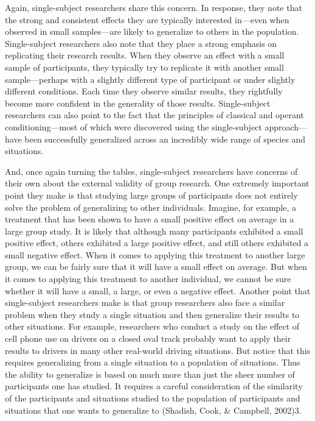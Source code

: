  Again, single-subject researchers share this concern. In response, they note that the strong and consistent effects they are typically interested in---even when observed in small samples---are likely to generalize to others in the population. Single-subject researchers also note that they place a strong emphasis on replicating their research results. When they observe an effect with a small sample of participants, they typically try to replicate it with another small sample---perhaps with a slightly different type of participant or under slightly different conditions. Each time they observe similar results, they rightfully become more confident in the generality of those results. Single-subject researchers can also point to the fact that the principles of classical and operant conditioning---most of which were discovered using the single-subject approach---have been successfully generalized across an incredibly wide range of species and situations.
 
 And, once again turning the tables, single-subject researchers have concerns of their own about the external validity of group research. One extremely important point they make is that studying large groups of participants does not entirely solve the problem of generalizing to other individuals. Imagine, for example, a treatment that has been shown to have a small positive effect on average in a large group study. It is likely that although many participants exhibited a small positive effect, others exhibited a large positive effect, and still others exhibited a small negative effect. When it comes to applying this treatment to another large group, we can be fairly sure that it will have a small effect on average. But when it comes to applying this treatment to another individual, we cannot be sure whether it will have a small, a large, or even a negative effect. Another point that single-subject researchers make is that group researchers also face a similar problem when they study a single situation and then generalize their results to other situations. For example, researchers who conduct a study on the effect of cell phone use on drivers on a closed oval track probably want to apply their results to drivers in many other real-world driving situations. But notice that this requires generalizing from a single situation to a population of situations. Thus the ability to generalize is based on much more than just the sheer number of participants one has studied. It requires a careful consideration of the similarity of the participants and situations studied to the population of participants and situations that one wants to generalize to (Shadish, Cook, \& Campbell, 2002)3.
 

